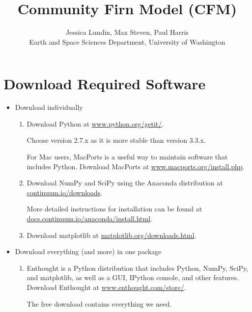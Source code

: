 \documentclass{article}
\begin{document}
\title{Community Firn Model (CFM)}
\author{Jessica Lundin, Max Steven, Paul Harris\\ Earth and Space Sciences Department, University of Washington}

\maketitle
\newpage

\section{Download Required Software}


\begin{itemize}
  \item Download individually
  \begin{enumerate}
    \item Download Python at \href{http://www.python.org/getit/}{www.python.org/getit/}.

    Choose version 2.7.x as it is more stable than version 3.3.x.

    For Mac users, MacPorts is a useful way to maintain software that includes Python. Download MacPorts at \href{http://www.macports.org/install.php}{www.macports.org/install.php}.
    
    \item Download NumPy and SciPy using the Anaconda distribution at \href{http://continuum.io/downloads}{continuum.io/downloads}.

    More detailed instructions for installation can be found at \href{http://docs.continuum.io/anaconda/install.html}{docs.continuum.io/anaconda/install.html}.
    
    \item Download matplotlib at \href{http://matplotlib.org/downloads.html}{matplotlib.org/downloads.html}.

  \end{enumerate}
  \item Download everything (and more) in one package
  
  \begin{enumerate}
    \item Enthought is a Python distribution that includes Python, NumPy, SciPy, and matplotlib, as well as a GUI, IPython console, and other features. Download Enthought at \href{https://www.enthought.com/store/}{www.enthought.com/store/}.

    The free download contains everything we need.
  \end{enumerate}
\end{itemize}
\end{document}
